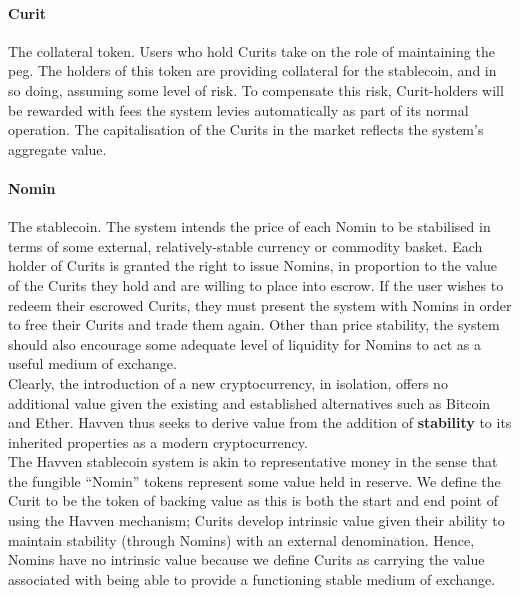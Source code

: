 \paragraph{Curit} The collateral token. Users who hold Curits take on the role of maintaining the peg. The holders of this token are providing collateral for the stablecoin, and in so doing, assuming some level of risk. To compensate this risk, Curit-holders will be rewarded with fees the system levies automatically as part of its normal operation. The capitalisation of the Curits in the market reflects the system's aggregate value.

\paragraph{Nomin} The stablecoin. The system intends the price of each Nomin to be stabilised in terms of some external, relatively-stable currency or commodity basket. Each holder of Curits is granted the right to issue Nomins, in proportion to the value of the Curits they hold and are willing to place into escrow. If the user wishes to redeem their escrowed Curits, they must present the system with Nomins in order to free their Curits and trade them again. Other than price stability, the system should also encourage some adequate level of liquidity for Nomins to act as a useful medium of exchange. \\

\noindent Clearly, the introduction of a new cryptocurrency, in isolation, offers no additional value given the existing and established alternatives such as Bitcoin and Ether. Havven thus seeks to derive value from the addition of \textbf{stability} to its inherited properties as a modern cryptocurrency. \\

\noindent The Havven stablecoin system is akin to representative money in the sense that the fungible ``Nomin'' tokens represent some value held in reserve. We define the Curit to be the token of backing value as this is both the start and end point of using the Havven mechanism; Curits develop intrinsic value given their ability to maintain stability (through Nomins) with an external denomination. Hence, Nomins have no intrinsic value because we define Curits as carrying the value associated with being able to provide a functioning stable medium of exchange. \\

